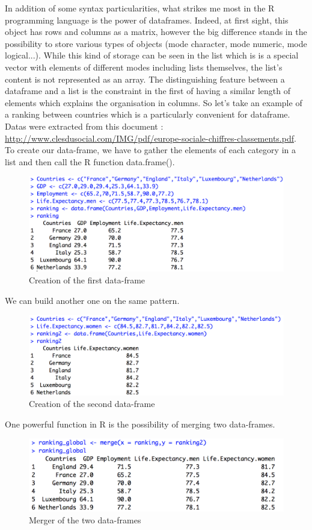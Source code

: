 \documentclass[a4paper,11pt]{article}
\begin{document}
 In addition of some syntax particularities, what strikes me most in the R programming language is the power of dataframes. 
 Indeed, at first sight, this object has rows and columns as a matrix, however the big difference stands in the possibility to store various types of objects (mode character, mode numeric, mode logical...).
 While this kind of storage can be seen in the list which is is a special vector with elements of different modes including lists themselves, the list's content is not represented as an array. 
The distinguishing feature between a dataframe and a list is the constraint in the first of having a similar length of elements which explains the organisation in columns. 
So let's take an example of a ranking between countries which is a particularly convenient for dataframe. Datas were extracted from this document : \url{http://www.clesdusocial.com/IMG/pdf/europe-sociale-chiffres-classements.pdf}.
To create our data-frame, we have to gather the elements of each category in a list and then call the R function data.frame().
\begin{figure}[H]
\centering
\includegraphics[width=.8\textwidth]{figure2}
 \caption{Creation of the first data-frame}
\label{figure2}
\end{figure}
We can build another one on the same pattern.
\begin{figure}[H]
\centering
\includegraphics[width=.8\textwidth]{figure3}
 \caption{Creation of the second data-frame}
\label{figure3}
\end{figure}
One powerful function in R is the possibility of merging two data-frames.
\begin{figure}[H]
\centering
\includegraphics[width=.8\textwidth]{figure4}
 \caption{Merger of the two data-frames}
\label{figure4}
\end{figure}
\end{document}
